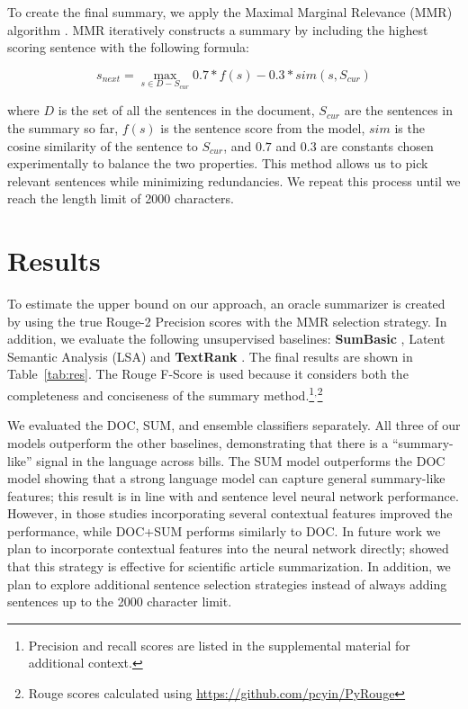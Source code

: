 \documentclass[11pt,a4paper]{article}
\begin{document}
To create the final summary, we apply the Maximal Marginal Relevance (MMR) algorithm \cite{goldstein2000mmr}. MMR iteratively constructs a summary by including the highest scoring sentence with the following formula:

\[s_{next} = \max\limits_{s \in D - S_{cur}} 0.7 * f(s) - 0.3 * \textit{sim}(s, S_{cur}) \]

where $D$ is the set of all the sentences in the document, $S_{cur}$ are the sentences in the summary so far, $f(s)$ is the sentence score from the model, $\textit{sim}$ is the cosine similarity of the sentence to $S_{cur}$, and $0.7$ and $0.3$ are constants chosen experimentally to balance the two properties. This method allows us to pick relevant sentences while minimizing redundancies. We repeat this process until we reach the length limit of 2000 characters.

\section{Results}

To estimate the upper bound on our approach, an oracle summarizer is created by using the true Rouge-2 Precision scores with the MMR selection strategy. In addition, we evaluate the following unsupervised baselines: \textbf{SumBasic} \cite{nenkova2005sumbasic}, Latent Semantic Analysis (LSA) \cite{gong2001lsa} and \textbf{TextRank} \cite{mihalcea2004textrank}.  The final results are shown in Table~\ref{tab:res}. The Rouge F-Score is used because it considers both the completeness and conciseness of the summary method.\footnote{Precision and recall scores are listed in the supplemental material for additional context.}$^,$\footnote{Rouge scores calculated using \url{https://github.com/pcyin/PyRouge}}

We evaluated the DOC, SUM, and ensemble classifiers separately. All three of our models outperform the other baselines, demonstrating that there is a ``summary-like'' signal in the language across bills. The SUM model outperforms the DOC model showing that a strong language model can capture general summary-like features; this result is in line with \citet{cao2015learning} and \citet{collins2017supervised} sentence level neural network performance. However, in those studies incorporating several contextual features improved the performance, while DOC+SUM performs similarly to DOC. In future work we plan to incorporate contextual features into the neural network directly; \citet{collins2017supervised} showed that this strategy is effective for scientific article summarization. In addition, we plan to explore additional sentence selection strategies instead of always adding sentences up to the 2000 character limit.
\end{document}
